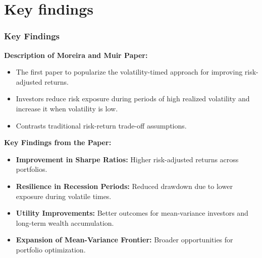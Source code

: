 \documentclass[9pt]{beamer}  %
\begin{document}
\section{Key findings}  %
\begin{frame}
    \frametitle{Key Findings}  %
    
    \textbf{Description of Moreira and Muir Paper:}  %
    \begin{itemize}  %
        \item The first paper to popularize the volatility-timed approach for improving risk-adjusted returns.
        \item Investors reduce risk exposure during periods of high realized volatility and increase it when volatility is low.
        \item Contrasts traditional risk-return trade-off assumptions.
    \end{itemize}

    \vspace{0.5cm}  %

    \textbf{Key Findings from the Paper:}  %
    \begin{itemize}  %
        \item \textbf{Improvement in Sharpe Ratios:} Higher risk-adjusted returns across portfolios.
        \item \textbf{Resilience in Recession Periods:} Reduced drawdown due to lower exposure during volatile times.
        \item \textbf{Utility Improvements:} Better outcomes for mean-variance investors and long-term wealth accumulation.
        \item \textbf{Expansion of Mean-Variance Frontier:} Broader opportunities for portfolio optimization.
    \end{itemize}
\end{frame}
\end{document}
